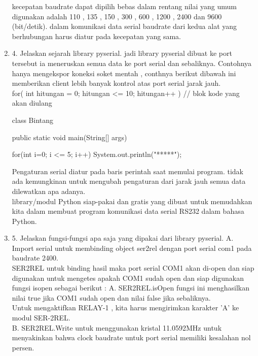 \begin{enumerate}
kecepatan baudrate dapat dipilih bebas dalam rentang nilai yang umum digunakan adalah 110 , 135 , 150 , 300 , 600 , 1200 , 2400 dan 9600 (bit/detik). dalam komunikasi data serial baudrate dari kedua alat yang berhubungan harus diatur pada kecepatan yang sama.\\

\item 4. Jelaskan sejarah library pyserial.
jadi library pyserial dibuat ke port tersebut ia meneruskan semua data ke port serial dan sebaliknya. Contohnya hanya mengekspor koneksi soket mentah , conthnya berikut dibawah ini memberikan client lebih banyak kontrol atas port serial jarak jauh.\\

for( int hitungan = 0; hitungan <= 10; hitungan++ ){
    // blok kode yang akan diulang
}

class Bintang{
    public static void main(String[] args){

        for(int i=0; i <= 5; i++){
            System.out.println("*****");
        }

    }
}
Pengaturan serial diatur pada baris perintah saat memulai program. tidak ada kemungkinan untuk mengubah pengaturan dari jarak jauh semua data dilewatkan apa adanya.\\

library/modul Python siap-pakai dan gratis yang dibuat untuk memudahkan kita dalam membuat program komunikasi data serial RS232 dalam bahasa Python.\\

\item 5. Jelaskan fungsi-fungsi apa saja yang dipakai dari library pyserial.
A. Import serial untuk membinding object ser2rel dengan port serial com1 pada baudrate 2400.\\

SER2REL untuk binding hasil maka port serial COM1 akan di-open dan siap digunakan untuk mengetes apakah COM1 sudah open dan siap digunakan fungsi isopen sebagai berikut :
A. SER2REL.isOpen fungsi ini menghasilkan nilai true jika COM1 sudah open dan nilai false jika sebaliknya.\\
Untuk mengaktifkan RELAY-1 , kita harus mengirimkan karakter 'A' ke modul SER-2REL.\\

B. SER2REL.Write untuk menggunakan kristal 11.0592MHz untuk menyakinkan bahwa clock baudrate untuk port serial memiliki kesalahan nol persen.\\


\end{enumerate}
